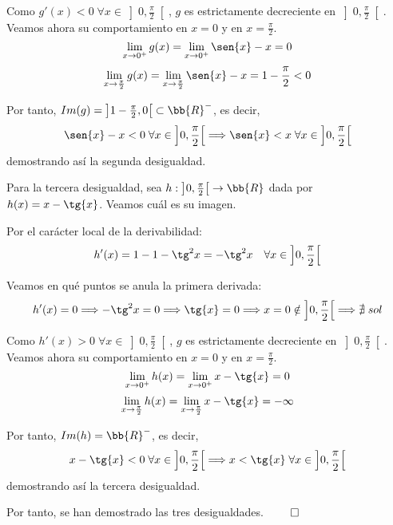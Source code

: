 \begin{ejercicio}
\begin{enumerate}
        Como $g'(x)<0 \; \forall x\in \left]0, \frac{\pi}{2} \right[$, $g$ es estrictamente decreciente en $\left]0, \frac{\pi}{2} \right[$. Veamos ahora su comportamiento en $x=0$ y en $x=\frac{\pi}{2}$.
        \begin{equation*}
            \lim_{x\to0^+}g(x)=\lim_{x\to0^+} \sen{x} -x = 0
        \end{equation*}
        \begin{equation*}
            \lim_{x\to\frac{\pi}{2}}g(x)=\lim_{x\to\frac{\pi}{2}} \sen{x} -x = 1-\frac{\pi}{2} <0
        \end{equation*}

        Por tanto, $Im(g)=\left]1-\frac{\pi}{2},0\right[ \subset \bb{R}^-$, es decir,
        $$\sen{x}-x <0 \;\forall x\in \left]0, \frac{\pi}{2} \right[ \Longrightarrow \sen{x} < x \;\forall x\in \left]0, \frac{\pi}{2} \right[ $$
        demostrando así la segunda desigualdad.

        Para la tercera desigualdad, sea $h:\left]0, \frac{\pi}{2} \right[ \to \bb{R}$ dada por $h(x)=x-\tg{x}$. Veamos cuál es su imagen.

        Por el carácter local de la derivabilidad:
        $$h'(x)=1-1- \tg^2{x} = -\tg^2{x} \quad \forall x \in \left]0, \frac{\pi}{2} \right[$$

        Veamos en qué puntos se anula la primera derivada:
        $$h'(x)=0 \Longrightarrow -\tg^2{x}=0 \Longrightarrow \tg{x}=0 \Longrightarrow x=0 \notin \left]0, \frac{\pi}{2} \right[ \Longrightarrow \nexists \;sol$$

        Como $h'(x)>0 \; \forall x\in \left]0, \frac{\pi}{2} \right[$, $g$ es estrictamente decreciente en $\left]0, \frac{\pi}{2} \right[$. Veamos ahora su comportamiento en $x=0$ y en $x=\frac{\pi}{2}$.
        \begin{equation*}
            \lim_{x\to0^+}h(x)=\lim_{x\to0^+} x-\tg{x} = 0
        \end{equation*}
        \begin{equation*}
           \lim_{x\to\frac{\pi}{2}}h(x)=\lim_{x\to\frac{\pi}{2}} x-\tg{x} = -\infty
        \end{equation*}

        Por tanto, $Im(h)=\bb{R}^-$, es decir,
        $$x-\tg{x} < 0 \;\forall x\in \left]0, \frac{\pi}{2} \right[ \Longrightarrow x < \tg{x}\;\forall x\in \left]0, \frac{\pi}{2} \right[ $$
        demostrando así la tercera desigualdad.

        Por tanto, se han demostrado las tres desigualdades. $\hfill \qed$
    \end{enumerate}
\end{ejercicio}

